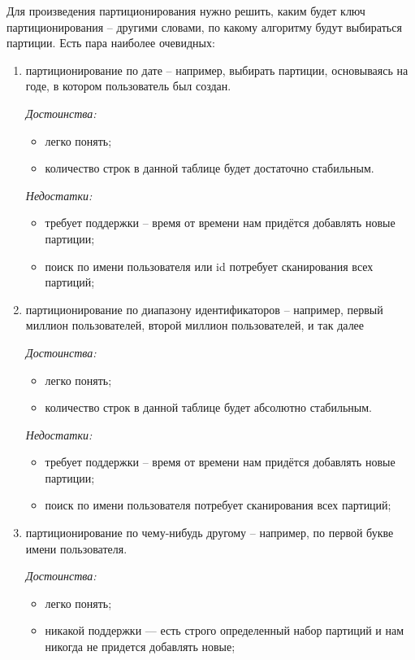 Для произведения партиционирования нужно решить, каким будет ключ партиционирования – другими словами, по какому алгоритму будут выбираться партиции. Есть пара наиболее очевидных: 
\begin{enumerate}
	\item партиционирование по дате – например, выбирать партиции, основываясь на годе, в котором пользователь был создан.
	
	\textit{Достоинства:}
	\begin{itemize}[label=--]
		\item легко понять;
		\item количество строк в данной таблице будет достаточно стабильным.
	\end{itemize}
	
	\textit{Недостатки:}
	\begin{itemize}[label=--]
		\item требует поддержки – время от времени нам придётся добавлять новые партиции;
		\item поиск по имени пользователя или id потребует сканирования всех партиций;
	\end{itemize}
	
	\item партиционирование по диапазону идентификаторов – например, первый миллион пользователей, второй миллион пользователей, и так далее
	
	\textit{Достоинства:}
	\begin{itemize}[label=--]
		\item легко понять;
		\item количество строк в данной таблице будет абсолютно стабильным.
	\end{itemize}
	
	\textit{Недостатки:}
	\begin{itemize}[label=--]
		\item требует поддержки – время от времени нам придётся добавлять новые партиции;
		\item поиск по имени пользователя потребует сканирования всех партиций; 
	\end{itemize}
	
	\item партиционирование по чему-нибудь другому – например, по первой букве имени пользователя. 
	
	\textit{Достоинства:}
	\begin{itemize}[label=--]
		\item легко понять;
		\item никакой поддержки --- есть строго определенный набор партиций и нам никогда не придется добавлять новые;
	\end{itemize}
	

\end{enumerate}
